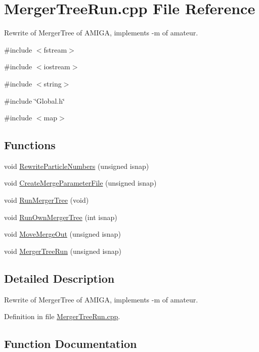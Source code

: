 \section{MergerTreeRun.cpp File Reference}
\label{MergerTreeRun_8cpp}


Rewrite of MergerTree of AMIGA, implements -\/m of amateur.  


{\ttfamily \#include $<$fstream$>$}\par
{\ttfamily \#include $<$iostream$>$}\par
{\ttfamily \#include $<$string$>$}\par
{\ttfamily \#include \char`\"{}Global.h\char`\"{}}\par
{\ttfamily \#include $<$map$>$}\par
\subsection*{Functions}
\begin{DoxyCompactItemize}
\item 
void \hyperlink{MergerTreeRun_8cpp_a23cf6a553f869f6aaa2805d8a6c6dd1b}{RewriteParticleNumbers} (unsigned isnap)
\item 
void \hyperlink{MergerTreeRun_8cpp_a1f0b0ef934eb143911f6c3b24a51dd8c}{CreateMergeParameterFile} (unsigned isnap)
\item 
void \hyperlink{MergerTreeRun_8cpp_a249560c73bf9e02187d6acad63254713}{RunMergerTree} (void)
\item 
void \hyperlink{MergerTreeRun_8cpp_abf85a822012ed8b72d6fb3e7a7f12b09}{RunOwnMergerTree} (int isnap)
\item 
void \hyperlink{MergerTreeRun_8cpp_ac3ed79fc9e96ec7f92c032854e2f0e05}{MoveMergeOut} (unsigned isnap)
\item 
void \hyperlink{MergerTreeRun_8cpp_a7fd5b46e681f15aaa5ca850f51d1fee4}{MergerTreeRun} (unsigned isnap)
\end{DoxyCompactItemize}


\subsection{Detailed Description}
Rewrite of MergerTree of AMIGA, implements -\/m of amateur. 

Definition in file \hyperlink{MergerTreeRun_8cpp_source}{MergerTreeRun.cpp}.



\subsection{Function Documentation}
